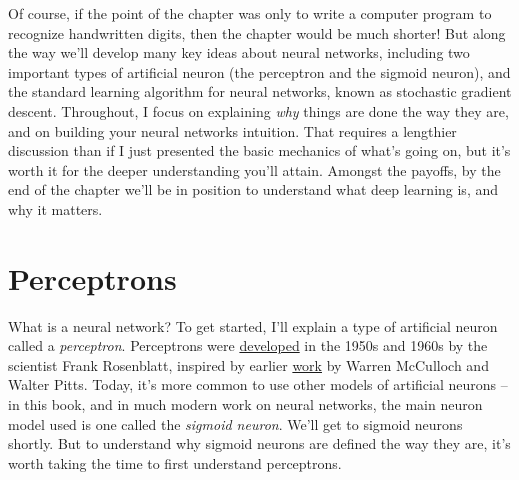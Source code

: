 \documentclass[a4paper,twoside,10pt]{book}
\begin{document}
Of course, if the point of the chapter was only to write a computer program to recognize handwritten digits, then the chapter would be much shorter! But along the way we'll develop many key ideas about neural networks, including two important types of artificial neuron (the perceptron and the sigmoid neuron), and the standard learning algorithm for neural networks, known as stochastic gradient descent. Throughout, I focus on explaining \textit{why} things are done the way they are, and on building your neural networks intuition. That requires a lengthier discussion than if I just presented the basic mechanics of what's going on, but it's worth it for the deeper understanding you'll attain. Amongst the payoffs, by the end of the chapter we'll be in position to understand what deep learning is, and why it matters.

\section{Perceptrons}
What is a neural network? To get started, I'll explain a type of artificial neuron called a \textit{perceptron}. Perceptrons were \href{http://books.google.ca/books/about/Principles_of_neurodynamics.html?id=7FhRAAAAMAAJ}{developed} in the 1950s and 1960s by the scientist Frank Rosenblatt, inspired by earlier \href{http://scholar.google.ca/scholar?cluster=4035975255085082870}{work} by Warren McCulloch and Walter Pitts. Today, it's more common to use other models of artificial neurons -- in this book, and in much modern work on neural networks, the main neuron model used is one called the \textit{sigmoid neuron}. We'll get to sigmoid neurons shortly. But to understand why sigmoid neurons are defined the way they are, it's worth taking the time to first understand perceptrons.
\end{document}
